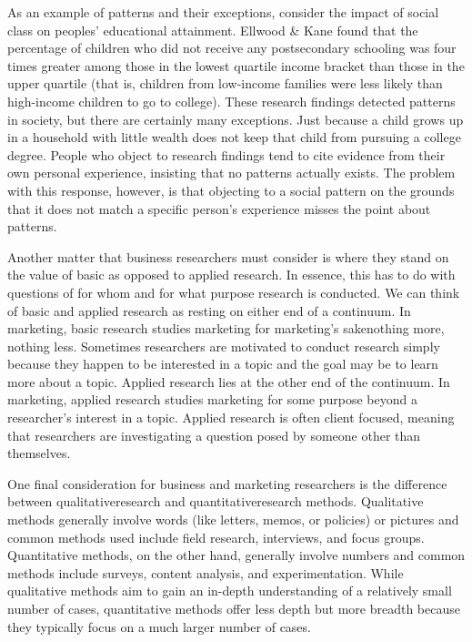 As an example of patterns and their exceptions, consider the impact of social class on peoples' educational attainment. Ellwood \& Kane\cite{ellwood2000getting} found that the percentage of children who did not receive any postsecondary schooling was four times greater among those in the lowest quartile income bracket than those in the upper quartile (that is, children from low-income families were less likely than high-income children to go to college). These research findings detected patterns in society, but there are certainly many exceptions. Just because a child grows up in a household with little wealth does not keep that child from pursuing a college degree. People who object to research findings tend to cite evidence from their own personal experience, insisting that no patterns actually exists. The problem with this response, however, is that objecting to a social pattern on the grounds that it does not match a specific person's experience misses the point about patterns.

Another matter that business researchers must consider is where they stand on the value of basic as opposed to applied research. In essence, this has to do with questions of for whom and for what purpose research is conducted. We can think of basic and applied research as resting on either end of a continuum. In marketing, basic research studies marketing for marketing's sake\textemdash nothing more, nothing less. Sometimes researchers are motivated to conduct research simply because they happen to be interested in a topic and the goal may be to learn more about a topic. Applied research lies at the other end of the continuum. In marketing, applied research studies marketing for some purpose beyond a researcher's interest in a topic. Applied research is often client focused, meaning that researchers are investigating a question posed by someone other than themselves.

One final consideration for business and marketing researchers is the difference between \gls{qualitativeresearch} and \gls{quantitativeresearch} methods. Qualitative methods generally involve words (like letters, memos, or policies) or pictures and common methods used include field research, interviews, and focus groups. Quantitative methods, on the other hand, generally involve numbers and common methods include surveys, content analysis, and experimentation. While qualitative methods aim to gain an in-depth understanding of a relatively small number of cases, quantitative methods offer less depth but more breadth because they typically focus on a much larger number of cases.

